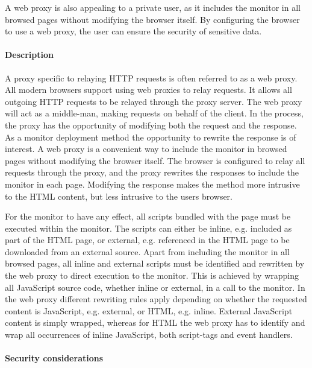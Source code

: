 \documentclass{llncs}
\begin{document}
A web proxy is also appealing to a private user, as it includes the monitor in all browsed pages without modifying 
the browser itself. By configuring the browser to use a web proxy, the user can ensure the security 
of sensitive data.

\paragraph{Description}
A proxy specific to relaying HTTP requests is often referred to as a web proxy.
All modern browsers support using web proxies to relay requests.
It allows all outgoing HTTP requests to be 
relayed through the proxy server. The web proxy will act as a middle-man, making 
requests on behalf of the client. In the process, the proxy has the 
opportunity of modifying both the request and the response. 
As a monitor deployment method the opportunity to rewrite the response is 
of interest. A web proxy is a convenient way to include the monitor in browsed pages without 
modifying the browser itself. The browser is configured to relay 
all requests through the proxy, and the proxy rewrites the responses to include 
the monitor in each page. Modifying the response makes the method more 
intrusive to the HTML content, but less intrusive to the users browser. 

For the monitor to have any effect, all scripts bundled with 
the page must be executed within the monitor. The scripts can either be inline, 
e.g. included as part of the HTML page, or external, e.g. referenced in the 
HTML page to be downloaded from an external source.
Apart from including the monitor in all browsed pages, all inline and external 
scripts must be identified and rewritten by the web proxy to direct execution to the monitor.
This is achieved by wrapping all JavaScript source code, whether inline or external, in a call to the monitor.
In the web proxy different rewriting rules apply depending on whether the 
requested content is JavaScript, e.g. external, or HTML, e.g. inline. External 
JavaScript content is simply wrapped, whereas 
for HTML the web proxy has to identify and wrap all occurrences of inline 
JavaScript, both script-tags and event handlers.


\paragraph{Security considerations}
\end{document}
